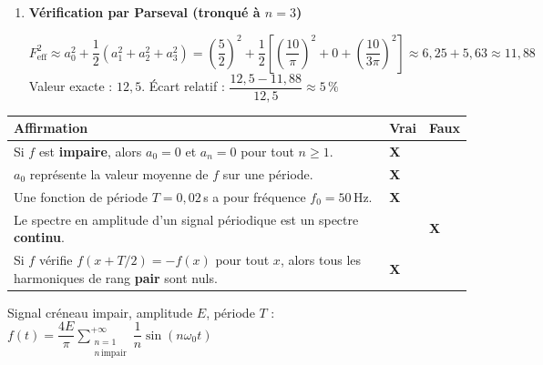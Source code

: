 \documentclass[a4paper,11pt]{article}
\begin{document}
\begin{enumerate}[label=\textbf{\arabic*.}]
\begin{enumerate}[label=\textbf{\alph*)}]
\item \textbf{Vérification par Parseval (tronqué à $n = 3$)}
\begin{tcolorbox}[corrigebox]
\[
F_{\mathrm{eff}}^2 \approx a_0^2 + \frac{1}{2}\left(a_1^2 + a_2^2 + a_3^2\right)
= \left(\frac{5}{2}\right)^{\!2} + \frac{1}{2}\left[\left(\frac{10}{\pi}\right)^{\!2} + 0 + \left(\frac{10}{3\pi}\right)^{\!2}\right]
\approx 6{,}25 + 5{,}63 \approx 11{,}88
\]
Valeur exacte : $12{,}5$. \quad Écart relatif : $\dfrac{12{,}5 - 11{,}88}{12{,}5} \approx 5\,\%$
\end{tcolorbox}
\end{enumerate}

\end{enumerate}

\newpage

\begin{tcolorbox}[exobox={Exercice 3 — Vrai ou Faux ?}]
\end{tcolorbox}

\renewcommand{\arraystretch}{2.2}
\begin{tabular}{|p{11.5cm}|>{\centering\arraybackslash}p{1.5cm}|>{\centering\arraybackslash}p{1.5cm}|}
\hline
\textbf{Affirmation} & \textbf{Vrai} & \textbf{Faux} \\
\hline
Si $f$ est \textbf{impaire}, alors $a_0 = 0$ et $a_n = 0$ pour tout $n \geq 1$. & \textcolor{green!60!black}{\textbf{X}} & \\
\hline
$a_0$ représente la valeur moyenne de $f$ sur une période. & \textcolor{green!60!black}{\textbf{X}} & \\
\hline
Une fonction de période $T = 0{,}02$\,s a pour fréquence $f_0 = 50$\,Hz. & \textcolor{green!60!black}{\textbf{X}} & \\
\hline
Le spectre en amplitude d'un signal périodique est un spectre \textbf{continu}. & & \textcolor{red!70!black}{\textbf{X}} \\
\hline
Si $f$ vérifie $f(x+T/2) = -f(x)$ pour tout $x$, alors tous les harmoniques de rang \textbf{pair} sont nuls. & \textcolor{green!60!black}{\textbf{X}} & \\
\hline
\end{tabular}

\vspace{0.3cm}

\begin{tcolorbox}[exobox={Exercice 4 — Spectre et Parseval}]
Signal créneau impair, amplitude $E$, période $T$ :
$f(t) = \dfrac{4E}{\pi}\displaystyle\sum_{\substack{n=1\\n\,\text{impair}}}^{+\infty}\dfrac{1}{n}\sin(n\omega_0 t)$
\end{tcolorbox}
\end{document}
